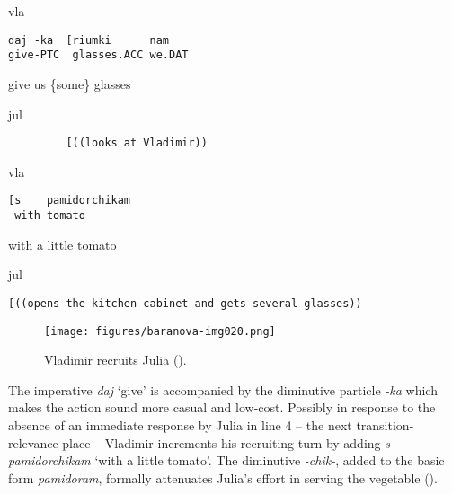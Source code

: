 \documentclass[output=paper,modfonts,nonflat]{langsci/langscibook}
\begin{document}
\vspace{2mm}
%
%
\begin{mdframednoverticalspace}[style=firstfoc]
\begin{transbox}{2}{vla}%
\begin{verbatim}
daj -ka  [riumki      nam
give-PTC  glasses.ACC we.DAT
\end{verbatim}
give us \{some\} glasses
\end{transbox}
\end{mdframednoverticalspace}
%
\begin{transbox}{3}{jul}%
\begin{verbatim}
         [((looks at Vladimir))
\end{verbatim}
\end{transbox}
%
%
\begin{mdframednoverticalspace}[style=firstfoc]
\begin{transbox}{5}{vla}
\begin{verbatim}
[s    pamidorchikam
 with tomato
\end{verbatim}
\hspace{0.07cm} with a little tomato
\end{transbox}
\end{mdframednoverticalspace}
%
\begin{mdframednoverticalspace}[style=secondfoc]
\begin{transbox}{6}{jul}%
\begin{verbatim}
[((opens the kitchen cabinet and gets several glasses))
\end{verbatim}
\end{transbox}
\end{mdframednoverticalspace}

\begin{figure}
\texttt{[image: figures/baranova-img020.png]}
\caption{Vladimir recruits Julia ().}
\label{fig:baranova:20}
\end{figure}

The imperative \textit{daj} ‘give’ is accompanied by the diminutive particle \textit{-ka} which makes the action sound more casual and low-cost. Possibly in response to the absence of an immediate response by Julia in line 4 -- the next transition-relevance place \citep{clayman_turn-constructional_2013} -- Vladimir increments his recruiting turn by adding \textit{s pamidorchikam} ‘with a little tomato’. The diminutive \textit{-chik-}, added to the basic form \textit{pamidoram}, formally attenuates Julia’s effort in serving the vegetable (\citealt{Ogiermann2009}).
\end{document}
